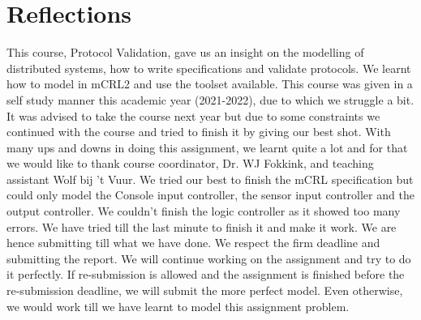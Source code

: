 \label{reflections}
\section{Reflections}
This course, Protocol Validation, gave us an insight on the modelling of distributed systems, how to write specifications and validate protocols. We learnt how to model in mCRL2 and use the toolset available. 
This course was given in a self study manner this academic year (2021-2022), due to which we struggle a bit. It was advised to take the course next year but due to some constraints we continued with the course and tried to finish it by giving our best shot.
With many ups and downs in doing this assignment, we learnt quite a lot and for that we would like to thank course coordinator, Dr. WJ Fokkink, and teaching assistant Wolf bij 't Vuur. 
We tried our best to finish the mCRL specification but could only model the Console input controller, the sensor input controller and the output controller. We couldn't finish the logic controller as it showed too many errors. We have tried till the last minute to finish it and make it work. We are hence submitting till what we have done. We respect the firm deadline and submitting the report. We will continue working on the assignment and try to do it perfectly. If re-submission is allowed and the assignment is finished before the re-submission deadline, we will submit the more perfect model. Even otherwise, we would work till we have learnt to model this assignment problem. 
